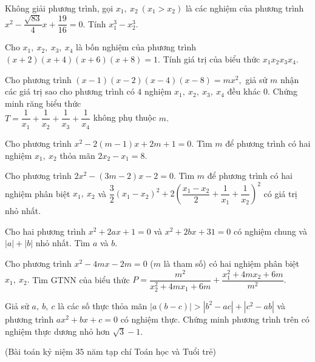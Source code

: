 \begin{bt}%
Không giải phương trình, gọi $x_1,~x_2~(x_1>x_2)$ là các nghiệm của phương trình\\ $x^2-\dfrac{\sqrt{83}}{4}x+\dfrac{19}{16}=0.$ Tính $x_1^3-x_2^3.$	
\end{bt}
\begin{bt}%
Cho $x_1,~x_2,~x_3,~x_4$ là bốn nghiệm của phương trình $(x+2)(x+4)(x+6)(x+8)=1.$ Tính giá trị của biểu thức $x_1x_2x_3x_4.$	
\end{bt}
\begin{bt}%
Cho phương trình $(x-1)(x-2)(x-4)(x-8)=mx^2,$ giả sử $m$ nhận các giá trị sao cho phương trình có $4$ nghiệm $x_1,~x_2,~x_3,~x_4$ đều khác $0.$ Chứng minh răng biểu thức\\ $T=\dfrac{1}{x_1}+\dfrac{1}{x_2}+\dfrac{1}{x_3}+\dfrac{1}{x_4}$ không phụ thuộc $m.$	
\end{bt}
\begin{bt}%
Cho phương trình $x^2-2(m-1)x+2m+1=0.$ Tìm $m$ để phương trình có hai nghiệm $x_1,~x_2$ thỏa mãn $2x_2-x_1=8.$	
\end{bt}
\begin{bt}%
Cho phương trình $2x^2-(3m-2)x-2=0.$ Tìm $m$ để phương trình có hai nghiệm phân biệt $x_1,~x_2$ và $\dfrac{3}{2}(x_1-x_2)^2+2\left(\dfrac{x_1-x_2}{2}+\dfrac{1}{x_1}+\dfrac{1}{x_2}\right)^2$ có giá trị nhỏ nhất.	
\end{bt}
\begin{bt}%
Cho hai phương trình $x^2+2ax+1=0$ và $x^2+2bx+31=0$ có nghiệm chung và $|a|+|b|$ nhỏ nhất. Tìm $a$ và $b.$	
\end{bt}
\begin{bt}%
Cho phương trình $x^2-4mx-2m=0$ ($m$ là tham số) có hai nghiệm phân biệt $x_1,~x_2.$ Tìm GTNN của biểu thức $P=\dfrac{m^2}{x_2^2+4mx_1+6m}	+\dfrac{x_1^2+4mx_2+6m}{m^2}.$
\end{bt}
\begin{bt}%
Giả sử $a,~b,~c$ là các số thực thỏa mãn $\left|a(b-c)\right|>\left|b^2-ac\right|+\left|c^2-ab\right|$ và phương trình $ax^2+bx+c=0$ có nghiệm thực. Chứng minh phương trình trên có nghiệm thực dương nhỏ hơn $\sqrt{3}-1.$
\begin{center}
	(Bài toán kỷ niệm $35$ năm tạp chí Toán học và Tuổi trẻ)
\end{center} 
\end{bt}
